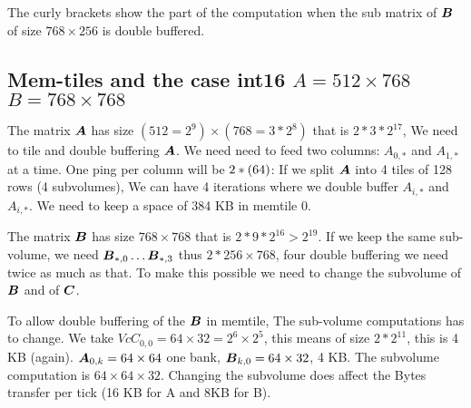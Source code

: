 \documentclass[conference]{IEEEtran}
\begin{document}
The curly brackets show the part of the computation when the sub
matrix of ${\boldsymbol B}$ of size $768 \times 256$ is double buffered.

\subsection{Mem-tiles and the case  int16  $A=512\times 768$ $B=768\times 768$ }

The matrix ${\boldsymbol A}$ has size $(512=2^9) \times (768= 3*2^8)$ that is
$2*3*2^{17}$, We need to tile and double buffering ${\boldsymbol A}$.  We need
need to feed two columns: $A_{0,*}$ and $A_{1,*}$ at a time. One ping
per column will be $2*(64 \time 768)$: If we split ${\boldsymbol A}$ into 4
tiles of 128 rows (4 subvolumes), We can have 4 iterations where we
double buffer $A_{i,*}$ and $A_{i,*}$. We need to keep a space of 384
KB in memtile 0.



The matrix ${\boldsymbol B}$ has size $768 \times 768$ that is
$2*9*2^{16}>2^{19}$. If we keep the same sub-volume, we need
${\boldsymbol B}_{*,0} \dots {\boldsymbol B}_{*,3}$ thus $2*256 \times 768$, four double
buffering we need twice as much as that. To make this possible we need
to change the subvolume of ${\boldsymbol B}$ and of ${\boldsymbol C}$.

To allow double buffering of the ${\boldsymbol B}$ in memtile, The sub-volume
computations has to change. We take $Vc{C}_{0,0} = 64\times 32 = 2^6
\times 2^5$, this means of size $2*2^{11}$, this is 4 KB
(again). ${\boldsymbol A}_{0,k} = 64 \times 64$ one bank, ${\boldsymbol B}_{k,0} = 64
\times 32$, 4 KB. The subvolume computation is $64\times 64 \times
32$. Changing the subvolume does affect the Bytes transfer per tick
(16 KB for A and 8KB for B). 
\end{document}
